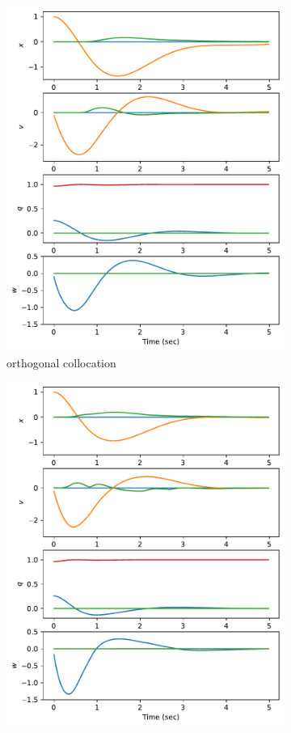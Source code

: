 \documentclass[]{article}
\begin{document}
\begin{figure}[H]
\begin{subfigure}[b]{0.3\textwidth}
		\includegraphics[width=\textwidth]{figures/statey115dx1.pdf}
		\caption{orthogonal collocation}
	\end{subfigure}%
	\begin{subfigure}[b]{0.3\textwidth}
		\centering
		\includegraphics[width=\textwidth]{figures/statey115dx2.pdf}

\end{subfigure}
\end{figure}
\end{document}
